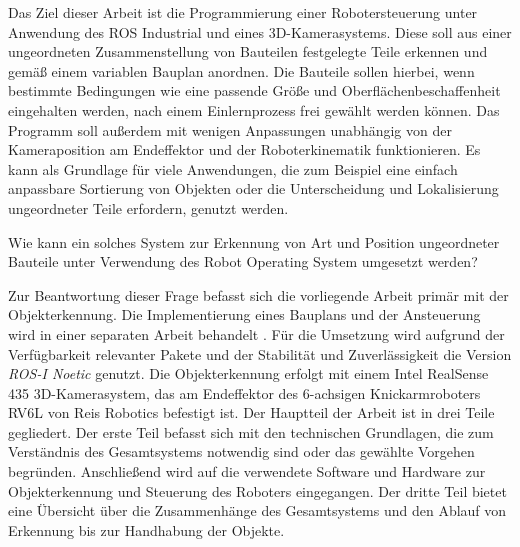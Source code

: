 Das Ziel dieser Arbeit ist die Programmierung einer Robotersteuerung unter Anwendung des \ac{ROS} Industrial und eines 3D-Kamerasystems. Diese soll aus einer ungeordneten Zusammenstellung von Bauteilen festgelegte Teile erkennen und gemäß einem variablen Bauplan anordnen. Die Bauteile sollen hierbei, wenn bestimmte Bedingungen wie eine passende Größe und Oberflächenbeschaffenheit eingehalten werden, nach einem Einlernprozess frei gewählt werden können. Das Programm soll außerdem mit wenigen Anpassungen unabhängig von der Kameraposition am Endeffektor und der Roboterkinematik funktionieren. Es kann als Grundlage für viele Anwendungen, die zum Beispiel eine einfach anpassbare Sortierung von Objekten oder die Unterscheidung und Lokalisierung ungeordneter Teile erfordern, genutzt werden.

Wie kann ein solches System zur Erkennung von Art und Position ungeordneter Bauteile unter Verwendung des Robot Operating System umgesetzt werden?

Zur Beantwortung dieser Frage befasst sich die vorliegende Arbeit primär mit der Objekterkennung. Die Implementierung eines Bauplans und der Ansteuerung wird in einer separaten Arbeit behandelt \cite[Dennis Steinbeck: Entwicklung einer KI-basierten Robotersteuerung mit Industrial ROS - Generierung von Handhabungssequenzen für mechanische Konstruktionen nach gegebenen Bauplänen]{steinbeck_entwicklung_2022}. Für die Umsetzung wird aufgrund der Verfügbarkeit relevanter Pakete und der Stabilität und Zuverlässigkeit die Version \textit{\ac{ROS}-I Noetic} genutzt. Die Objekterkennung erfolgt mit einem Intel RealSense 435 3D-Kamerasystem, das am Endeffektor des 6-achsigen Knickarmroboters RV6L von Reis Robotics befestigt ist. Der Hauptteil der Arbeit ist in drei Teile gegliedert. Der erste Teil befasst sich mit den technischen Grundlagen, die zum Verständnis des Gesamtsystems notwendig sind oder das gewählte Vorgehen begründen. Anschließend wird auf die verwendete Software und Hardware zur Objekterkennung und Steuerung des Roboters eingegangen. Der dritte Teil bietet eine Übersicht über die Zusammenhänge des Gesamtsystems und den Ablauf von Erkennung bis zur Handhabung der Objekte.
